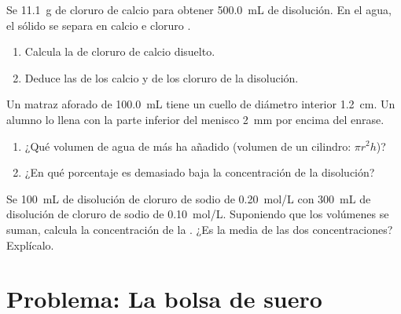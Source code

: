 \begin{exercise}[$\star\star\star$]\label{exo:g10:concentration-and-dilution:13}
Se  \qty{11.1}{g} de cloruro de calcio  para obtener
\qty{500.0}{mL} de disolución. En el agua, el sólido se separa en 
calcio  e  cloruro .
\begin{enumerate}
  \item Calcula la  de cloruro de calcio disuelto.
  \item Deduce las  de los  calcio y de los
         cloruro de la disolución.
\end{enumerate}
\end{exercise}

\begin{exercise}[$\star\star\star$]\label{exo:g10:concentration-and-dilution:14}
Un matraz aforado de \qty{100.0}{mL} tiene un cuello de diámetro
interior \qty{1.2}{cm}. Un alumno lo llena con la parte inferior del
menisco \qty{2}{mm} por encima del enrase.
\begin{enumerate}
  \item ¿Qué volumen de agua de más ha añadido (volumen de un cilindro:
        $\pi r^2 h$)?
  \item ¿En qué porcentaje es demasiado baja la concentración de la
        disolución?
\end{enumerate}
\end{exercise}

\begin{exercise}[$\star\star\star$]\label{exo:g10:concentration-and-dilution:15}
Se  \qty{100}{mL} de disolución de cloruro de sodio de
\qty{0.20}{mol/L} con \qty{300}{mL} de disolución de cloruro de sodio de
\qty{0.10}{mol/L}. Suponiendo que los volúmenes se suman, calcula la
concentración de la . ¿Es la media de las dos concentraciones?
Explícalo.
\end{exercise}

\section{Problema: La bolsa de suero}

